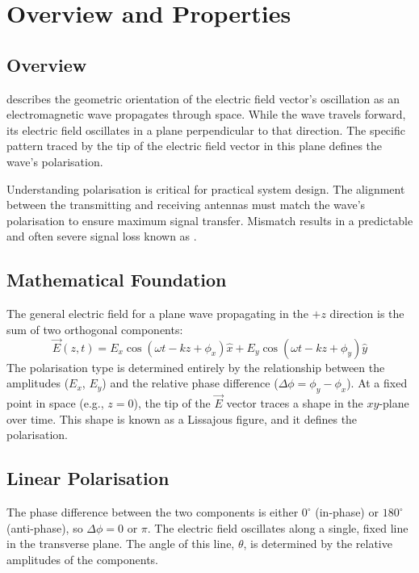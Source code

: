 \section{Overview and Properties}

\subsection{Overview}

 describes the geometric orientation of the electric field vector's oscillation as an electromagnetic wave propagates through space. While the wave travels forward, its electric field oscillates in a plane perpendicular to that direction. The specific pattern traced by the tip of the electric field vector in this plane defines the wave's polarisation.

\begin{keyconcept}
    Understanding polarisation is critical for practical system design. The alignment between the transmitting and receiving antennas must match the wave's polarisation to ensure maximum signal transfer. Mismatch results in a predictable and often severe signal loss known as .
\end{keyconcept}


\subsection{Mathematical Foundation}

The general electric field for a plane wave propagating in the $+z$ direction is the sum of two orthogonal components:
\begin{equation}
    \vec{E}(z,t) = E_x \cos(\omega t - kz + \phi_x)\hat{x} + E_y \cos(\omega t - kz + \phi_y)\hat{y}
    \label{eq:general-efield}
\end{equation}
The polarisation type is determined entirely by the relationship between the amplitudes ($E_x$, $E_y$) and the relative phase difference ($\Delta\phi = \phi_y - \phi_x$). At a fixed point in space (e.g., $z=0$), the tip of the $\vec{E}$ vector traces a shape in the $xy$-plane over time. This shape is known as a Lissajous figure, and it defines the polarisation.


\subsection{Linear Polarisation}

 The phase difference between the two components is either $0^\circ$ (in-phase) or $180^\circ$ (anti-phase), so $\Delta\phi = 0$ or $\pi$.
 The electric field oscillates along a single, fixed line in the transverse plane. The angle of this line, $\theta$, is determined by the relative amplitudes of the components.


